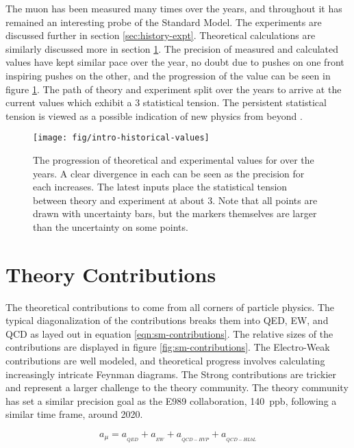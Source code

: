 The muon \gmtwo has been measured many times over the years, and throughout it has remained an interesting probe of the Standard Model.  The experiments are discussed further in section \ref{sec:history-expt}.  Theoretical calculations are similarly discussed more in section \ref{sec:theory}.  The precision of measured and calculated \mugmtwo values have kept similar pace over the year, no doubt due to pushes on one front inspiring pushes on the other, and the progression of the value can be seen in figure \ref{fig:intro-historical-values}.  The path of theory and experiment split over the years to arrive at the current values which exhibit a \SI{3}{\sigma} statistical tension.  The persistent statistical tension is viewed as a possible indication of new physics from beyond \tsm.

\begin{figure}
\label{fig:intro-historical-values}
\centering
\texttt{[image: fig/intro-historical-values]}
\caption{The progression of theoretical and experimental values for \mugmtwo over the years.  A clear divergence in each can be seen as the precision for each increases.  The latest inputs place the statistical tension between theory and experiment at about \SI{3}{\sigma}. Note that all points are drawn with uncertainty bars, but the markers themselves are larger than the uncertainty on some points. }
\end{figure}

\section{Theory Contributions} \label{sec:theory}

The theoretical contributions to \mugmtwo come from all corners of particle physics.  The typical diagonalization of the contributions breaks them into QED, EW, and QCD as layed out in equation \ref{eqn:sm-contributions}. The relative sizes of the contributions are displayed in figure \ref{fig:sm-contributions}. The Electro-Weak contributions are well modeled, and theoretical progress involves calculating increasingly intricate Feynman diagrams.  The Strong contributions are trickier and represent a larger challenge to the theory community.  The theory community has set a similar precision goal as the E989 collaboration, \SI{140}{ppb}, following a similar time frame, around 2020\cite{e989-tdr}.

\begin{equation}
\label{eqn:sm-contributions}
a_\mu = a_{_{QED}} + a_{_{EW}} + a_{_{QCD-HVP}} + a_{_{QCD-HLbL}}
\end{equation}

